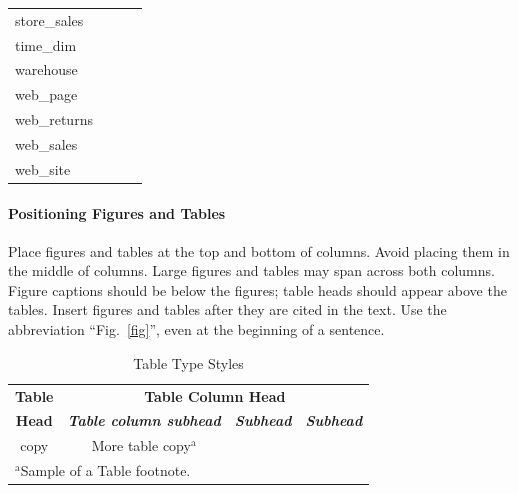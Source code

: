 \documentclass[conference]{IEEEtran}
\begin{document}
\begin{table}[htbp]
\begin{center}
\begin{tabular}{|l|c|c|c|}
			store\_sales            & \checkmark          &                    &                \\
			time\_dim               & \checkmark          &                    &                \\
			warehouse               & \checkmark          &                    &                \\
			web\_page               &                     &                    & \checkmark     \\
			web\_returns            &                     &                    & \checkmark     \\
			web\_sales              & \checkmark          &                    &                \\
			web\_site               &                     &                    & \checkmark     \\
			\hline
		\end{tabular}
		\label{table:data-distribution-2}
	\end{center}
\end{table}


\paragraph{Positioning Figures and Tables} Place figures and tables at the top and
bottom of columns. Avoid placing them in the middle of columns. Large
figures and tables may span across both columns. Figure captions should be
below the figures; table heads should appear above the tables. Insert
figures and tables after they are cited in the text. Use the abbreviation
``Fig.~\ref{fig}'', even at the beginning of a sentence.

\begin{table}[htbp]
	\caption{Table Type Styles}
	\begin{center}
		\begin{tabular}{|c|c|c|c|}
			\hline
			\textbf{Table} & \multicolumn{3}{|c|}{\textbf{Table Column Head}}                                                         \\
			\cline{2-4}
			\textbf{Head}  & \textbf{\textit{Table column subhead}}           & \textbf{\textit{Subhead}} & \textbf{\textit{Subhead}} \\
			\hline
			copy           & More table copy$^{\mathrm{a}}$                   &                           &                           \\
			\hline
			\multicolumn{4}{l}{$^{\mathrm{a}}$Sample of a Table footnote.}
		\end{tabular}
		\label{tab1}
	\end{center}
\end{table}
\end{document}
